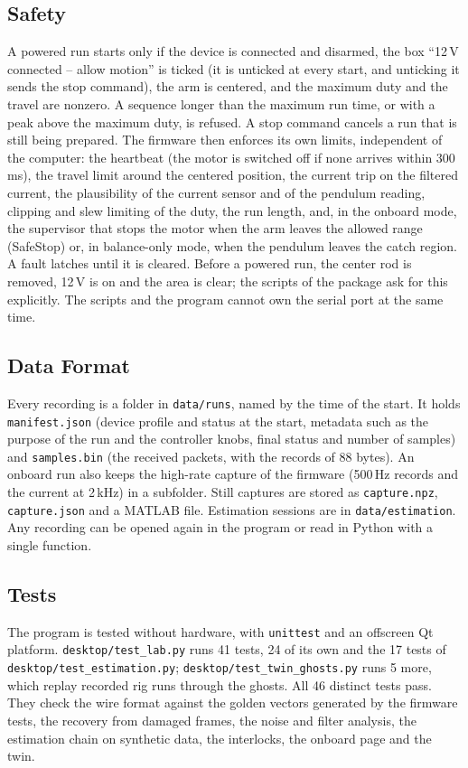 \documentclass[a4paper,11pt]{article}
\begin{document}
\subsection{Safety}
\label{sec:app_safety}
A powered run starts only if the device is connected and disarmed, the box ``12\,V connected -- allow motion'' is ticked (it is unticked at every start, and unticking it sends the stop command), the arm is centered, and the maximum duty and the travel are nonzero. A sequence longer than the maximum run time, or with a peak above the maximum duty, is refused. A stop command cancels a run that is still being prepared. The firmware then enforces its own limits, independent of the computer: the heartbeat (the motor is switched off if none arrives within 300\,ms), the travel limit around the centered position, the current trip on the filtered current, the plausibility of the current sensor and of the pendulum reading, clipping and slew limiting of the duty, the run length, and, in the onboard mode, the supervisor that stops the motor when the arm leaves the allowed range (SafeStop) or, in balance-only mode, when the pendulum leaves the catch region. A fault latches until it is cleared. Before a powered run, the center rod is removed, 12\,V is on and the area is clear; the scripts of the package ask for this explicitly. The scripts and the program cannot own the serial port at the same time.

\subsection{Data Format}
\label{sec:app_data}
Every recording is a folder in \nolinkurl{data/runs}, named by the time of the start. It holds \texttt{manifest.json} (device profile and status at the start, metadata such as the purpose of the run and the controller knobs, final status and number of samples) and \texttt{samples.bin} (the received packets, with the records of 88 bytes). An onboard run also keeps the high-rate capture of the firmware (500\,Hz records and the current at 2\,kHz) in a subfolder. Still captures are stored as \texttt{capture.npz}, \texttt{capture.json} and a MATLAB file. Estimation sessions are in \nolinkurl{data/estimation}. Any recording can be opened again in the program or read in Python with a single function.

\subsection{Tests}
\label{sec:app_tests}
The program is tested without hardware, with \texttt{unittest} and an offscreen Qt platform. \nolinkurl{desktop/test_lab.py} runs 41 tests, 24 of its own and the 17 tests of \nolinkurl{desktop/test_estimation.py}; \nolinkurl{desktop/test_twin_ghosts.py} runs 5 more, which replay recorded rig runs through the ghosts. All 46 distinct tests pass. They check the wire format against the golden vectors generated by the firmware tests, the recovery from damaged frames, the noise and filter analysis, the estimation chain on synthetic data, the interlocks, the onboard page and the twin.
\end{document}
